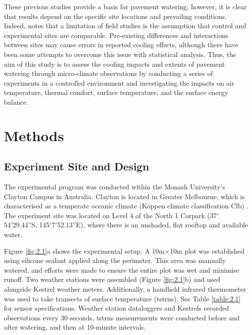 \documentclass[final,3p,times,authoryear]{elsarticle}
\begin{document}
These previous studies provide a basis for pavement watering; however, it is clear that results depend on the specific site locations and prevailing conditions. Indeed, \cite{Hendel2016} notes that a limitation of field studies is the assumption that control and experimental sites are comparable. Pre-existing differences and interactions between sites may cause errors in reported cooling effects, although there have been some attempts to overcome this issue with statistical analysis. Thus, the aim of this study is to assess the cooling impacts and extents of pavement watering through micro-climate observations by conducting a series of experiments in a controlled environment and investigating the impacts on air temperature, thermal comfort, surface temperature, and the surface energy balance. 




\section{Methods}\label{sec:methods2}
\subsection{Experiment Site and Design}\label{sec:methods2.1}

The experimental program was conducted within the Monash University's Clayton Campus in Australia. Clayton is located in Greater Melbourne, which is characterised as a temperate oceanic climate (K\"{o}ppen climate classification Cfb) \citep{Beck2018}. The experiment site was located on Level 4 of the North 1 Carpark (37$^{\circ}$54'29.44''S, 145$^{\circ}$7'52.13''E), where there is an unshaded, flat rooftop and available water.

Figure \ref{fig:2.1}a shows the experimental setup. A 10m$\times$10m plot was established using silicone sealant applied along the perimeter. This area was manually watered, and efforts were made to ensure the entire plot was wet and minimise runoff. Two weather stations were assembled (Figure \ref{fig:2.1}b) and used alongside Kestrel weather meters. Additionally, a handheld infrared thermometer was used to take transects of surface temperature (\gls{tstrns}). See Table \ref{table:2.1} for sensor specifications. Weather station dataloggers and Kestrels recorded observations every 30 seconds. \gls{tstrns} measurements were conducted before and after watering, and then at 10-minute intervals.
\end{document}
